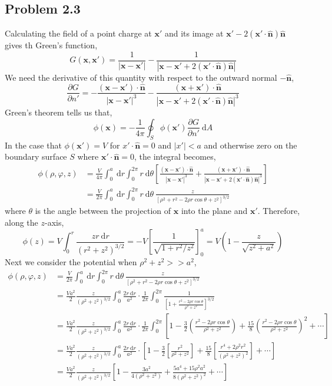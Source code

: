 \documentclass[12pt]{extarticle}
\renewcommand{\d}[1]{\: \mathrm{d}#1}
\newcommand{\pderiv}[2]{\frac{\partial{#1}}{\partial{#2}}}
\renewcommand{\bf}[1]{\mathbf{#1}}
\theoremstyle{definition}
\newcommand{\nhat}{\hat{\bf{n}}}
\newcommand{\x}{\mathbf{x}}
\begin{document}
\subsection{Problem 2.3}


Calculating the field of a point charge at $\x'$ and its image at $\x' - 2 (\x' \cdot \nhat) \nhat$ gives th Green's function,
\[ G(\x, \x') = \frac{1}{|\x - \x'|} - \frac{1}{|\x - \x' + 2 (\x' \cdot \nhat) \nhat| } \]
We need the derivative of this quantity with respect to the outward normal $-\nhat$,
\[ \pderiv{G}{n'} = - \frac{(\x - \x') \cdot \nhat}{|\x - \x'|^3} - \frac{(\x + \x') \cdot \nhat}{|\x - \x' + 2 (\x' \cdot \nhat) \nhat|^3 } \]
Green's theorem tells us that,
\[ \phi(\x) = - \frac{1}{4 \pi} \oint_S \phi(\x') \pderiv{G}{n'} \d{A} \]
In the case that $\phi(\x') = V$ for $x' \cdot \nhat = 0$ and $|x'| < a$ and otherwise zero on the boundary surface $S$ where $\x' \cdot \nhat = 0$, the integral becomes,
\begin{align*}
\phi(\rho, \varphi, z) & = \frac{V}{4 \pi} \int_0^a \d{r} \int_0^{2 \pi} r \d{\theta} \left[ \frac{(\x - \x') \cdot \nhat}{|\x - \x'|^3} + \frac{(\x + \x') \cdot \nhat}{|\x - \x' + 2 (\x' \cdot \nhat) \nhat|^3 } \right] 
\\
& = \frac{V}{2 \pi} \int_0^a \d{r} \int_0^{2\pi} r \d{\theta} \:  \frac{z}{[\rho^2 + r^2 - 2 \rho r \cos{\theta} + z^2]^{3/2}} 
\end{align*} 
where $\theta$ is the angle between the projection of $\x$ into the plane and $\x'$. Therefore, along the $z$-axis,
\[ \phi(z) = V \int_0^r \frac{zr \d{r} }{(r^2 + z^2)^{3/2}} = -V \left[ \frac{1}{\sqrt{1 + r^2 / z^2}} \right]_0^a = V \left(1 - \frac{z}{\sqrt{z^2 + a^2}} \right)  \]
Next we consider the potential when $\rho^2 + z^2 >> a^2$,
\begin{align*}
\phi(\rho, \varphi, z) & = \frac{V}{2 \pi} \int_0^a \d{r} \int_0^{2\pi} r \d{\theta} \: \frac{z}{[\rho^2 + r^2 - 2 \rho r \cos{\theta} + z^2]^{3/2}} 
\\
& = \frac{Va^2}{2} \frac{z}{(\rho^2 + z^2)^{3/2}}  \int_0^a \frac{2r \d{r}}{a^2}  \cdot \frac{1}{2\pi} \int_0^{2 \pi} \frac{1}{ \left[ 1 + \frac{r^2 - 2 \rho r \cos{\theta}}{\rho^2 + z^2} \right]^{3/2}} 
\\
& = \frac{Va^2}{2} \frac{z}{(\rho^2 + z^2)^{3/2}}  \int_0^a \frac{2r \d{r}}{a^2}  \cdot \frac{1}{2\pi} \int_0^{2 \pi} \left[ 1 - \frac{3}{2} \left( \frac{r^2 - 2 \rho r \cos{\theta}}{\rho^2 + z^2} \right) + \frac{15}{8} \left( \frac{r^2 - 2 \rho r \cos{\theta}}{\rho^2 + z^2} \right)^2 + \cdots \right]
\\
& = \frac{Va^2}{2} \frac{z}{(\rho^2 + z^2)^{3/2}}  \int_0^a \frac{2r \d{r}}{a^2}  \cdot \left[ 1 - \frac{3}{2} \left[ \frac{r^2}{\rho^2 + z^2} \right] + \frac{15}{8}  \left[ \frac{r^4 + 2 \rho^2 r^2}{(\rho^2 + z^2)^2} \right] + \cdots \right]
\\
& = \frac{Va^2}{2} \frac{z}{(\rho^2 + z^2)^{3/2}}  \left[ 1 - \frac{3a^2}{4(\rho^2 + z^2)} + \frac{5a^4 + 15 \rho^2 a^2}{8(\rho^2 + z^2)^2} + \cdots \right]
\end{align*} 
\end{document}
